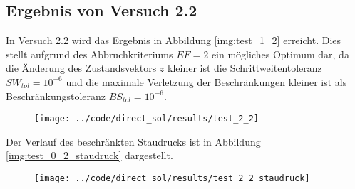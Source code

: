 \subsection{Ergebnis von Versuch 2.2}\label{kap:Versuch22}
In Versuch 2.2 wird das Ergebnis in Abbildung \ref{img:test_1_2} erreicht. Dies stellt aufgrund des Abbruchkriteriums $EF = 2$ ein mögliches Optimum dar, da die Änderung des Zustandsvektors $z$ kleiner ist die Schrittweitentoleranz $SW_{tol} = 10^{-6}$ und die maximale Verletzung der Beschränkungen kleiner ist als Beschränkungstoleranz $BS_{tol} = 10^{-6}$.
\begin{figure}[H]
\begin{center}
\texttt{[image: ../code/direct\_sol/results/test\_2\_2]}
 \label{img:test_2_2}
\end{center}
\end{figure}
Der Verlauf des beschränkten Staudrucks ist in Abbildung \ref{img:test_0_2_staudruck} dargestellt.
\begin{figure}[H]
\begin{center}
\texttt{[image: ../code/direct\_sol/results/test\_2\_2\_staudruck]}
 \label{img:test_2_2_staudruck}
\end{center}
\end{figure}














\newpage
